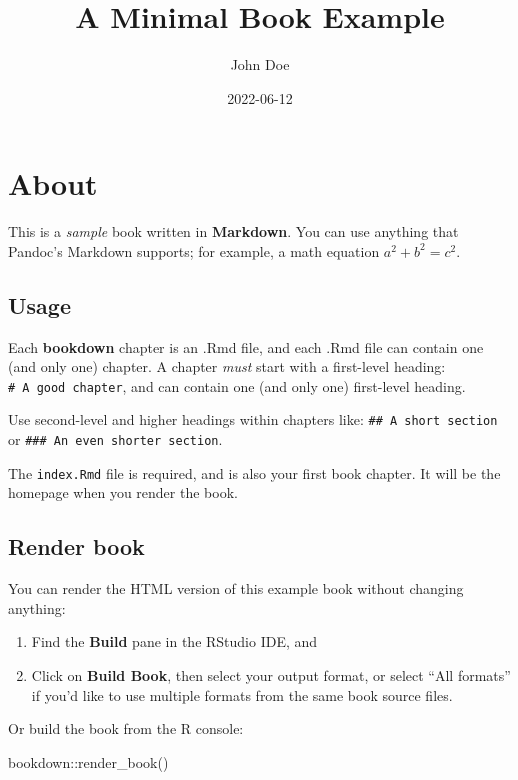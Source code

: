 \documentclass[
]{book}
\title{A Minimal Book Example}
\author{John Doe}
\date{2022-06-12}
\newenvironment{Shaded}{\begin{snugshade}}{\end{snugshade}}
\newcommand{\FunctionTok}[1]{\textcolor[rgb]{0.00,0.00,0.00}{#1}}
\newcommand{\NormalTok}[1]{#1}
\newcommand{\SpecialCharTok}[1]{\textcolor[rgb]{0.00,0.00,0.00}{#1}}
\theoremstyle{definition}
\theoremstyle{definition}
\theoremstyle{definition}
\theoremstyle{definition}
\theoremstyle{remark}
\begin{document}
\maketitle

{
\setcounter{tocdepth}{1}
\tableofcontents
}
\hypertarget{about}{%
\chapter{About}\label{about}}

This is a \emph{sample} book written in \textbf{Markdown}. You can use anything that Pandoc's Markdown supports; for example, a math equation \(a^2 + b^2 = c^2\).

\hypertarget{usage}{%
\section{Usage}\label{usage}}

Each \textbf{bookdown} chapter is an .Rmd file, and each .Rmd file can contain one (and only one) chapter. A chapter \emph{must} start with a first-level heading: \texttt{\#\ A\ good\ chapter}, and can contain one (and only one) first-level heading.

Use second-level and higher headings within chapters like: \texttt{\#\#\ A\ short\ section} or \texttt{\#\#\#\ An\ even\ shorter\ section}.

The \texttt{index.Rmd} file is required, and is also your first book chapter. It will be the homepage when you render the book.

\hypertarget{render-book}{%
\section{Render book}\label{render-book}}

You can render the HTML version of this example book without changing anything:

\begin{enumerate}
\def\labelenumi{\arabic{enumi}.}
\item
  Find the \textbf{Build} pane in the RStudio IDE, and
\item
  Click on \textbf{Build Book}, then select your output format, or select ``All formats'' if you'd like to use multiple formats from the same book source files.
\end{enumerate}

Or build the book from the R console:

\begin{Shaded}
\begin{Highlighting}[]
\NormalTok{bookdown}\SpecialCharTok{::}\FunctionTok{render\_book}\NormalTok{()}
\end{Highlighting}
\end{Shaded}
\end{document}
